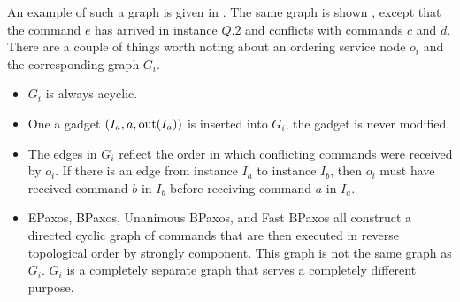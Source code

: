 An example of such a graph is given in
. The same graph is shown
, except that the command $e$ has
arrived in instance $Q.2$ and conflicts with commands $c$ and $d$.
%
There are a couple of things worth noting about an ordering service node $o_i$
and the corresponding graph $G_i$.
\begin{itemize}
  \item
    $G_i$ is always acyclic.
  \item
    One a gadget $(I_a, a, \text{out}(I_a))$ is inserted into $G_i$, the gadget is
    never modified.
  \item
    The edges in $G_i$ reflect the order in which conflicting commands were
    received by $o_i$. If there is an edge from instance $I_a$ to instance
    $I_b$, then $o_i$ must have received command $b$ in $I_b$ before receiving
    command $a$ in $I_a$.
  \item
    EPaxos, BPaxos, Unanimous BPaxos, and Fast BPaxos all construct a directed
    cyclic graph of commands that are then executed in reverse topological
    order by strongly component. This graph is not the same graph as $G_i$.
    $G_i$ is a completely separate graph that serves a completely different
    purpose.
\end{itemize}

